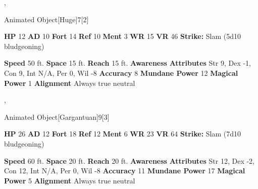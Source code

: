   ,
  \begin{monsubsection}{Animated Object}[Huge]{7}[2]
    \vspace{-1em}\vspace{-1em}
    \vspace{0em}

    
    

    \begin{spellcontent}
      \begin{spelltargetinginfo}
        \pari \textbf{HP} 12 \monsep
          \textbf{AD} 10 \monsep
          \textbf{Fort} 14 \monsep
          \textbf{Ref} 10 \monsep
          \textbf{Ment} 3
        \pari \textbf{WR} 15 \monsep
        \textbf{VR} 46
        \pari \textbf{Strike:}
            Slam  (5d10 bludgeoning)
      \end{spelltargetinginfo}
    \end{spellcontent}
    \begin{monsterfooter}
      \pari \textbf{Speed} 50 ft. \monsep
        \textbf{Space} 15 ft. \monsep
        \textbf{Reach} 15 ft.
      \pari \textbf{Awareness} 
      \pari \textbf{Attributes}
        Str 9, Dex -1,
        Con 9, Int N/A,
        Per 0, Wil -8
      \pari \textbf{Accuracy} 8 \monsep
        \textbf{Mundane Power} 12 \monsep
      \textbf{Magical Power} 1
      \pari \textbf{Alignment} Always true neutral
    \end{monsterfooter}
  \end{monsubsection}
  
  ,
  \begin{monsubsection}{Animated Object}[Gargantuan]{9}[3]
    \vspace{-1em}\vspace{-1em}
    \vspace{0em}

    
    

    \begin{spellcontent}
      \begin{spelltargetinginfo}
        \pari \textbf{HP} 26 \monsep
          \textbf{AD} 12 \monsep
          \textbf{Fort} 18 \monsep
          \textbf{Ref} 12 \monsep
          \textbf{Ment} 6
        \pari \textbf{WR} 23 \monsep
        \textbf{VR} 64
        \pari \textbf{Strike:}
            Slam  (7d10 bludgeoning)
      \end{spelltargetinginfo}
    \end{spellcontent}
    \begin{monsterfooter}
      \pari \textbf{Speed} 60 ft. \monsep
        \textbf{Space} 20 ft. \monsep
        \textbf{Reach} 20 ft.
      \pari \textbf{Awareness} 
      \pari \textbf{Attributes}
        Str 12, Dex -2,
        Con 12, Int N/A,
        Per 0, Wil -8
      \pari \textbf{Accuracy} 11 \monsep
        \textbf{Mundane Power} 17 \monsep
      \textbf{Magical Power} 5
      \pari \textbf{Alignment} Always true neutral
    \end{monsterfooter}
  \end{monsubsection}
  
